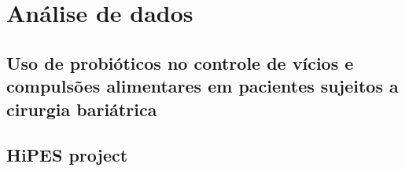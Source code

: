 \chapter{Análise de dados}


\section{Uso de probióticos no controle de vícios e compulsões alimentares em pacientes sujeitos a cirurgia bariátrica}




\section{HiPES project}

